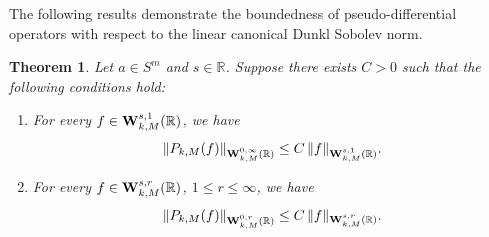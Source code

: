 \documentclass[12pt,a4paper,reqno]{amsproc}
\newtheorem{theorem}{Theorem}[section]
\theoremstyle{definition}
\theoremstyle{remark}
\numberwithin{equation}{section}
\begin{document}
The following results demonstrate the boundedness of pseudo-differential operators with respect to the linear canonical Dunkl Sobolev norm.
\begin{theorem}
Let $a \in S^m$ and $s\in \mathbb{R}$. Suppose there exists $C>0$ such that the following conditions hold:
\begin{enumerate}[$(i)$]
\item For every $f\in {\bf{W}}_{k,M}^{s,1}(\mathbb{R})$, we have
\begin{equation*}
\|P_{k,M}(f)\|_{{\bf{W}}_{k,M}^{0,\infty
}(\mathbb{R})}  \le C \,\|f\|_{{\bf{W}}_{k,M}^{s,1
}(\mathbb{R})}.
\end{equation*}
\item For every $f\in {\bf{W}}_{k,M}^{s,r}(\mathbb{R})$, $1\le r \le \infty$, we have
\begin{equation*}
\|P_{k,M}(f)\|_{{\bf{W}}_{k,M}^{0,r
}(\mathbb{R})}  \le C \,\|f\|_{{\bf{W}}_{k,M}^{s,r
}(\mathbb{R})}.  
\end{equation*}
\end{enumerate}
\end{theorem}
\end{document}
